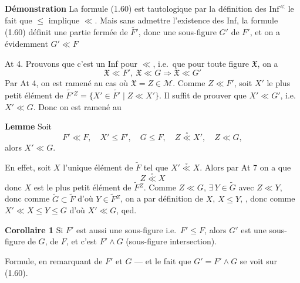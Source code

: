 \documentclass[11pt,a4paper]{article}
\begin{document}
\textbf{Démonstration} La formule (1.60)  est tautologique par la définition des $\mathrm{Inf}^{\ll}$ \ill{} le fait que $\leq$ implique $\ll$. Mais sans admettre l'existence des Inf, la formule (1.60) définit une partie fermée de $\widetilde{F'}$, donc une sous-figure $G'$ de $F'$, et on a évidemment $G' \ll F$ 


At 4. Prouvons que c'est un Inf pour $\ll$, i.e.\ que pour toute figure $\mathfrak{X}$, on a
\[
  \mathfrak{X} \ll F',\ \mathfrak{X} \ll G \Longrightarrow \mathfrak{X} \ll G'
\]
Par At 4, on est ramené au cas où $\mathfrak{X} = Z \in \mathcal{M}$. Comme $Z \ll F'$, soit $X'$ le plus petit élément de $\widetilde{F'}{}^{Z} = \lbrace X' \in \widetilde{F'} \mid Z \ll X' \rbrace$. Il suffit de prouver que $X' \ll G'$, i.e.\ $X' \ll G$. Donc on est ramené au

\textbf{Lemme} Soit
\[
  F' \ll F, \quad X' \leq F', \quad G \leq F, \quad Z \overset{\circ}{\ll} X', \quad Z \ll G,
\]
alors \struck{\ill{}} $X' \ll G$.

En effet, soit $X$ l'unique élément de $\widetilde{F}$ tel que $X' \overset{\circ}{\ll} X$. Alors par At 7 on a que
\[
  Z \overset{\circ}{\ll} X
\]
donc $X$ est le plus petit élément de $\widetilde{F}{}^{Z}$. Comme $Z \ll G$, $\exists\, Y \in \widetilde{G}$ avec $Z \ll Y$,  donc comme $\widetilde{G} \subset \widetilde{F}$ d'où $Y \in \widetilde{F}{}^{Z}$, on a par définition de $X$, $X \leq Y$, , donc  comme $X' \ll X \leq Y \leq G$ d'où $X' \ll G$, qed.

\textbf{Corollaire 1}  Si $F'$ est aussi une sous-figure i.e.\ $F' \leq F$, alors $G'$ est une  sous-figure de $G$, \ill{} de $F$, et c'est $F' \wedge G$ (sous-figure intersection).

Formule, en remarquant  de $F'$ et $G$ --- et le fait que $G' = F' \wedge G$ se voit sur (1.60).
\end{document}
